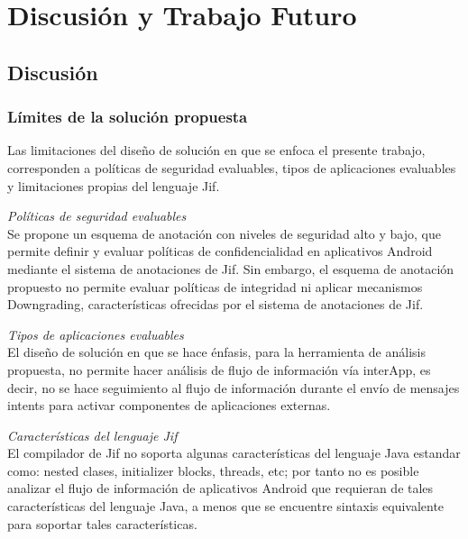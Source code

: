 \section{Discusión y Trabajo Futuro}
\subsection{Discusión}
\subsubsection{Límites de la solución propuesta}
Las limitaciones del diseño de solución en que se enfoca el presente trabajo,
corresponden a políticas de seguridad evaluables, tipos de aplicaciones
evaluables y limitaciones propias del lenguaje Jif.

\emph{Políticas de seguridad evaluables}\\
Se propone un esquema de anotación con niveles de seguridad alto y
bajo, que permite definir y evaluar políticas de confidencialidad en aplicativos
Android mediante el sistema de anotaciones de Jif.
Sin embargo, el esquema de anotación propuesto no permite evaluar políticas de
integridad ni aplicar mecanismos Downgrading, características ofrecidas por el
sistema de anotaciones de Jif.

\emph{Tipos de aplicaciones evaluables}\\
El diseño de solución en que se hace énfasis, para la
herramienta de análisis propuesta, no permite hacer análisis de flujo de
información vía interApp, es decir, no se hace seguimiento al flujo de
información durante el envío de mensajes intents para activar componentes de
aplicaciones externas.

\emph{Características del lenguaje Jif}\\
El compilador de Jif no soporta algunas características del lenguaje Java
estandar como: nested clases, initializer blocks, threads, etc; por tanto no es
posible analizar el flujo de información de aplicativos Android que requieran de
tales características del lenguaje Java, a menos que se encuentre sintaxis
equivalente para soportar tales características.\newline 

